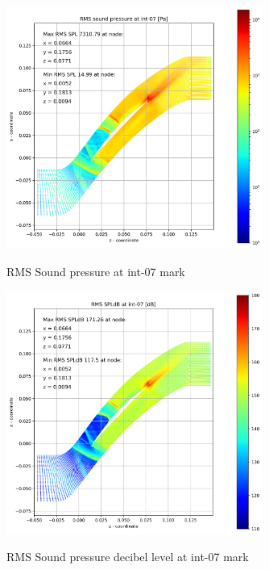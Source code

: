 \begin{figure}[ht]
  \centering
  \includegraphics[width=0.75\textwidth]{Figures/int-07-rms-spl.png} \label{int-07-rms-spl}
  \caption{RMS Sound pressure at int-07 mark}
  
  \vspace*{\floatsep}%

  \includegraphics[width=0.75\textwidth]{Figures/int-07-rms-spldb.png} \label{int-07-rms-spldb}
  \caption{RMS Sound pressure decibel level at int-07 mark}
\end{figure}
